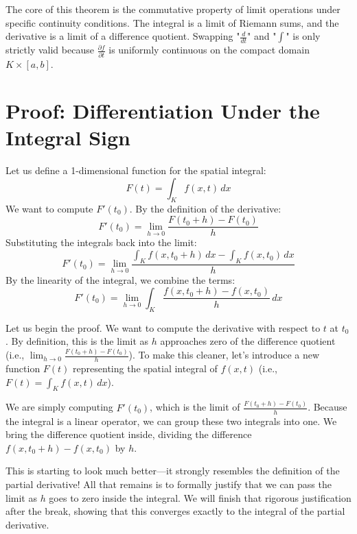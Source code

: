 \begin{redundant-explanation}
The core of this theorem is the commutative property of limit operations under specific continuity conditions. The integral is a limit of Riemann sums, and the derivative is a limit of a difference quotient. Swapping "$\frac{d}{dt}$" and "$\int$" is only strictly valid because $\frac{\partial f}{\partial t}$ is uniformly continuous on the compact domain $K \times [a,b]$.
\end{redundant-explanation}


\section{Proof: Differentiation Under the Integral Sign}

\begin{math-stroke}
Let us define a 1-dimensional function for the spatial integral:
\[
F(t) = \int_K f(x,t) \, dx
\]
We want to compute $F'(t_0)$. By the definition of the derivative:
\[
F'(t_0) = \lim_{h \to 0} \frac{F(t_0 + h) - F(t_0)}{h}
\]
Substituting the integrals back into the limit:
\[
F'(t_0) = \lim_{h \to 0} \frac{\int_K f(x, t_0 + h) \, dx - \int_K f(x, t_0) \, dx}{h}
\]
By the linearity of the integral, we combine the terms:
\[
F'(t_0) = \lim_{h \to 0} \int_K \frac{f(x, t_0 + h) - f(x, t_0)}{h} \, dx
\]
\end{math-stroke}

\begin{spoken-clean}[41:03 - 44:55]
Let us begin the proof. We want to compute the derivative with respect to $t$ at $t_0$. By definition, this is the limit as $h$ approaches zero of the difference quotient (i.e., $\lim_{h \to 0} \frac{F(t_0 + h) - F(t_0)}{h}$). To make this cleaner, let's introduce a new function $F(t)$ representing the spatial integral of $f(x,t)$ (i.e., $F(t) = \int_K f(x,t) \, dx$). 

We are simply computing $F'(t_0)$, which is the limit of $\frac{F(t_0 + h) - F(t_0)}{h}$. Because the integral is a linear operator, we can group these two integrals into one. We bring the difference quotient inside, dividing the difference $f(x, t_0 + h) - f(x, t_0)$ by $h$. 

This is starting to look much better—it strongly resembles the definition of the partial derivative! All that remains is to formally justify that we can pass the limit as $h$ goes to zero inside the integral. We will finish that rigorous justification after the break, showing that this converges exactly to the integral of the partial derivative.
\end{spoken-clean}

